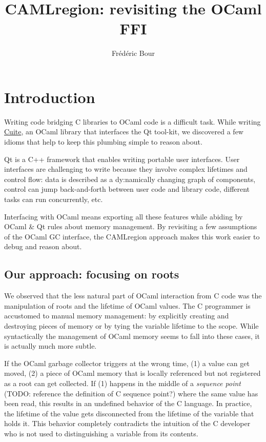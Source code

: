 \documentclass[a4paper]{easychair}
\title{CAMLregion: revisiting the OCaml FFI}
\author{
  Frédéric Bour
}
\institute{
  Facebook --
  \email{def@fb.com}
}
\begin{document}
\maketitle

\hypertarget{introduction}{%
\section{Introduction}\label{introduction}}

Writing code bridging C libraries to OCaml code is a difficult task.
While writing \href{https://github.com/let-def/cuite}{Cuite}, an OCaml
library that interfaces the Qt tool-kit, we discovered a few idioms that
help to keep this plumbing simple to reason about.

Qt is a C++ framework that enables writing portable user interfaces.
User interfaces are challenging to write because they involve complex
lifetimes and control flow: data is described as a dy:namically changing
graph of components, control can jump back-and-forth between user code
and library code, different tasks can run concurrently, etc.

Interfacing with OCaml means exporting all these features while abiding
by OCaml \& Qt rules about memory management. By revisiting a few
assumptions of the OCaml GC interface, the CAMLregion approach makes
this work easier to debug and reason about.

\hypertarget{our-approach-focusing-on-roots}{%
\subsection{Our approach: focusing on
roots}\label{our-approach-focusing-on-roots}}

We observed that the less natural part of OCaml interaction from C code
was the manipulation of roots and the lifetime of OCaml values. The C
programmer is accustomed to manual memory management: by explicitly
creating and destroying pieces of memory or by tying the variable
lifetime to the scope. While syntactically the management of OCaml
memory seems to fall into these cases, it is actually much more subtle.

If the OCaml garbage collector triggers at the wrong time, (1) a value
can get moved, (2) a piece of OCaml memory that is locally referenced
but not registered as a root can get collected. If (1) happens in the
middle of a \emph{sequence point} (TODO: reference the definition of C
sequence point?) where the same value has been read, this results in an
undefined behavior of the C language. In practice, the lifetime of the
value gets disconnected from the lifetime of the variable that holds it.
This behavior completely contradicts the intuition of the C developer
who is not used to distinguishing a variable from its contents.
\end{document}
